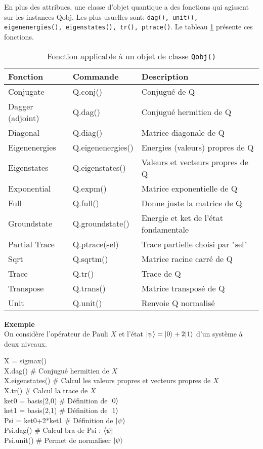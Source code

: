 En plus des attribues, une classe d'objet quantique a des fonctions qui
agissent sur les instances Qobj. Les plus usuelles sont: \texttt{dag(), unit(), eigenenergies(), eigenstates(), tr(), ptrace()}.
Le tableau \ref{fonction} présente ces fonctions.
\begin{table}[!h]
\begin{center}
\begin{tabular}{|l|l|l|} \hline \hline
\textbf{Fonction}	& \textbf{Commande}	& \textbf{Description} \\ \hline \hline
Conjugate	& Q.conj()	& Conjugué de Q\\ \hline
Dagger (adjoint)	& Q.dag()	& Conjugué hermitien de Q\\ \hline
Diagonal	& Q.diag()	& Matrice diagonale de Q\\ \hline
Eigenenergies	& Q.eigenenergies()	&  Energies (valeurs) propres de Q\\ \hline
Eigenstates	& Q.eigenstates()	& Valeurs et vecteurs propres de Q\\ \hline
Exponential	& Q.expm()	& Matrice exponentielle de Q\\ \hline
Full	& Q.full()	& Donne juste la matrice de Q\\ \hline
Groundstate	& Q.groundstate()	& Energie et ket de l'état fondamentale\\ \hline
Partial Trace	& Q.ptrace(sel)	& Trace partielle choisi par "sel"\\ \hline
Sqrt	& Q.sqrtm()	& Matrice racine carré de Q\\ \hline
Trace	& Q.tr()	&  Trace de Q \\ \hline
Transpose	&  Q.trans()	& Matrice transposé de Q \\ \hline
Unit	& Q.unit()	& Renvoie Q normalisé \\ \hline
\end{tabular}
\caption{Fonction applicable à un objet de classe \texttt{Qobj()}}
\label{fonction}
\end{center}
\end{table}

\textbf{Exemple}\\
On considère l'opérateur de Pauli $X$ et l'état $\vert\psi\rangle=\vert0\rangle+2\vert1\rangle$ d'un système à deux niveaux.\\
\begin{tt}
X = sigmax()\\
X.dag() \# Conjugué hermitien de $X$\\
X.eigenstates() \# Calcul les valeurs propres et vecteurs propres de $X$\\
X.tr() \# Calcul la trace de $X$\\
ket0 = basis(2,0) \# Définition de $\vert0\rangle$\\
ket1 = basis(2,1) \# Définition de $\vert1\rangle$\\
Psi = ket0+2*ket1 \# Définition de $\vert\psi\rangle$\\
Psi.dag() \# Calcul bra de Psi : $\langle\psi\vert$\\
Psi.unit() \# Permet de normaliser $\vert\psi\rangle$\\
\end{tt}
